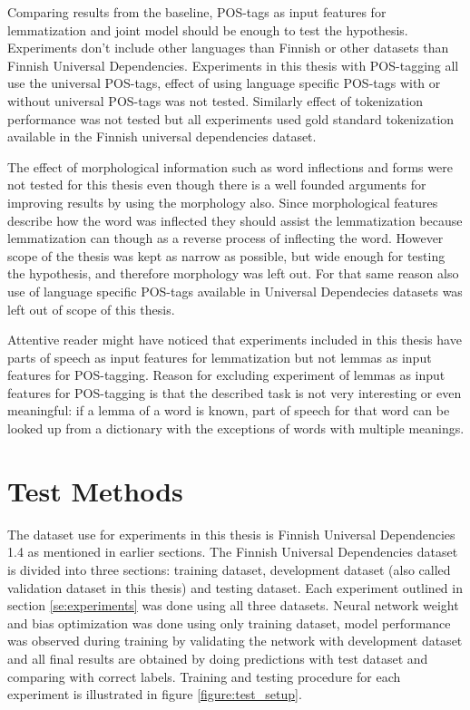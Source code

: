 \documentclass[12pt,a4paper,english
]{tutthesis}
\begin{document}
Comparing results from the baseline, POS-tags as input features for lemmatization and joint model should be enough to test the hypothesis. Experiments don't include other languages than Finnish or other datasets than Finnish Universal Dependencies. Experiments in this thesis with POS-tagging all use the universal POS-tags, effect of using language specific POS-tags with or without universal POS-tags was not tested. Similarly effect of tokenization performance was not tested but all experiments used gold standard tokenization available in the Finnish universal dependencies dataset.

The effect of morphological information such as word inflections and forms were not tested for this thesis even though there is a well founded arguments for improving results by using the morphology also. Since morphological features describe how the word was inflected they should assist the lemmatization because lemmatization can though as a reverse process of inflecting the word. However scope of the thesis was kept as narrow as possible, but wide enough for testing the hypothesis, and therefore morphology was left out. For that same reason also use of language specific POS-tags available in Universal Dependecies datasets was left out of scope of this thesis. 

Attentive reader might have noticed that experiments included in this thesis have parts of speech as input features for lemmatization but not lemmas as input features for POS-tagging. Reason for excluding experiment of lemmas as input features for POS-tagging is that the described task is not very interesting or even meaningful: if a lemma of a word is known, part of speech for that word can be looked up from a dictionary with the exceptions of words with multiple meanings.


\section{Test Methods}
\label{se:test_methods}
The dataset use for experiments in this thesis is Finnish Universal Dependencies 1.4 as mentioned in earlier sections. The Finnish Universal Dependencies dataset is divided into three sections: training dataset, development dataset (also called validation dataset in this thesis) and testing dataset. Each experiment outlined in section \ref{se:experiments} was done using all three datasets. Neural network weight and bias optimization was done using only training dataset, model performance was observed during training by validating the network with development dataset and all final results are obtained by doing predictions with test dataset and comparing with correct labels. Training and testing procedure for each experiment is illustrated in figure \ref{figure:test_setup}.
\end{document}
